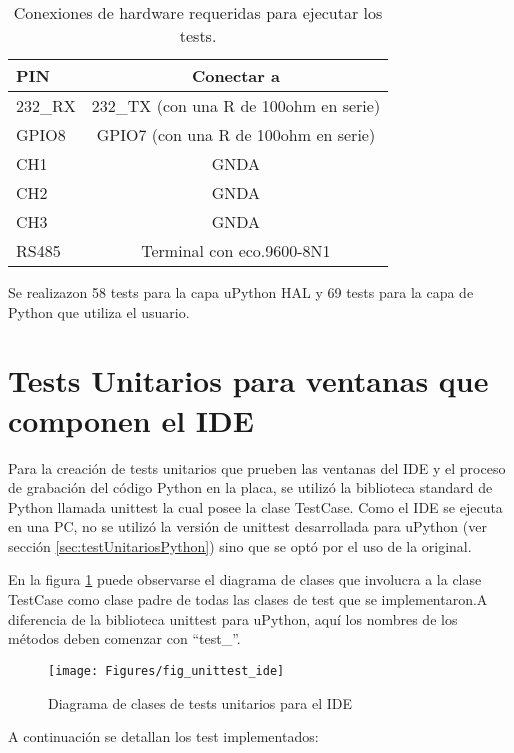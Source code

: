 \begin{table}[h]
	\centering
	\caption[]{Conexiones de hardware requeridas para ejecutar los tests.}
	\begin{tabular}{l c}    
		\toprule
		\textbf{PIN} 	 	& \textbf{Conectar a}   									\\
		\midrule
		232\_RX	 				& 232\_TX (con una R de 100ohm en serie)		\\	
		GPIO8	 					& GPIO7 (con una R de 100ohm en serie)		\\		
		CH1	 						& GNDA																		\\		
		CH2	 						& GNDA																		\\		
		CH3	 						& GNDA																		\\		
		RS485						& Terminal con eco.9600-8N1								\\
		\bottomrule
		\hline
	\end{tabular}
	\label{tab:hardreq}
\end{table}

Se realizazon 58 tests para la capa uPython HAL y 69 tests para la capa de Python que utiliza el usuario.

\section{Tests Unitarios para ventanas que componen el IDE}
\label{sec:testUnitariosIDE}

Para la creación de tests unitarios que prueben las ventanas del IDE y el proceso de grabación del código Python en la placa, se utilizó la biblioteca standard de Python llamada unittest la cual posee la clase TestCase. Como el IDE se ejecuta en una PC, no se utilizó la versión de unittest desarrollada para uPython (ver sección \ref{sec:testUnitariosPython}) sino que se optó por el uso de la original.

En la figura \ref{fig:unittestide} puede observarse el diagrama de clases que involucra a la clase TestCase como clase padre de todas las clases de test que se implementaron.A diferencia de la biblioteca unittest para uPython, aquí los nombres de los métodos deben comenzar con “test\_”.

\begin{figure}[h]
  \centering
    \texttt{[image: Figures/fig\_unittest\_ide]}
  \caption{Diagrama de clases de tests unitarios para el IDE}
  \label{fig:unittestide}
\end{figure}

A continuación se detallan los test implementados:

